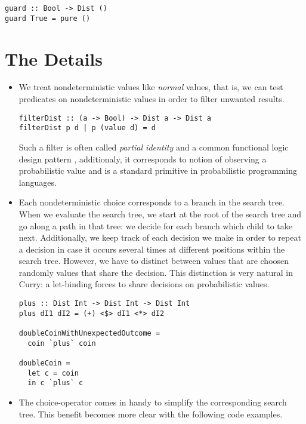 \documentclass[
12pt, %
a4paper, %
oneside, %
]{llncs}
\begin{document}
\begin{verbatim}
guard :: Bool -> Dist ()
guard True = pure ()
\end{verbatim}

\section{The Details}

\begin{itemize}

\item We treat nondeterministic values like \emph{normal} values, that
  is, we can test predicates on nondeterministic values in order to
  filter unwanted results. %

\begin{verbatim}
filterDist :: (a -> Bool) -> Dist a -> Dist a
filterDist p d | p (value d) = d
\end{verbatim}

  Such a filter is often called \emph{partial identity} and a common
  functional logic design pattern \cite{funcLogPattern}, additionaly,
  it corresponds to notion of observing a probabilistic value and is a
  standard primitive in probabilistic programming languages. %
 
\item Each nondeterministic choice corresponds to a branch in the
  search tree. %
  When we evaluate the search tree, we start at the root of the search
  tree and go along a path in that tree: we decide for each branch
  which child to take next. %
  Additionally, we keep track of each decision we make in order to
  repeat a decision in case it occurs several times at different
  positions within the search tree. %
  However, we have to distinct between values that are choosen
  randomly values that share the decision. %
  This distinction is very natural in Curry: a let-binding forces to
  share decisions on probabilistic values. %

\begin{verbatim}
plus :: Dist Int -> Dist Int -> Dist Int
plus dI1 dI2 = (+) <$> dI1 <*> dI2

doubleCoinWithUnexpectedOutcome =
  coin `plus` coin

doubleCoin =
  let c = coin
  in c `plus` c
\end{verbatim}

\item The choice-operator comes in handy to simplify the corresponding
  search tree. %
  This benefit becomes more clear with the following code examples. %


\end{itemize}
\end{document}
